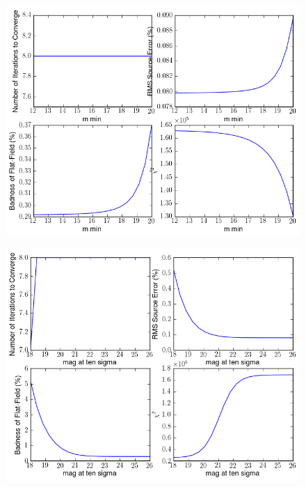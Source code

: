 \documentclass[manuscript]{aastex}
\begin{document}
\begin{figure}[ht]
\begin{center}
\includegraphics[width=\textwidth]{m_min.png}
\end{center}
\end{figure}

\begin{figure}[ht]
\begin{center}
\includegraphics[width=\textwidth]{mag_at_10_sigma.png}
\end{center}
\end{figure}
\end{document}
